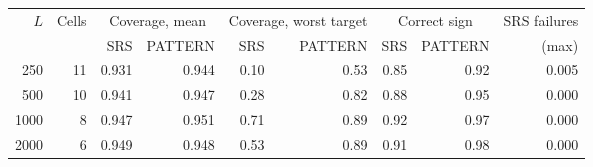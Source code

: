 \begin{tabular}{rrrrrrrrr}\toprule
$L$ & Cells & \multicolumn{2}{c}{Coverage, mean} & \multicolumn{2}{c}{Coverage, worst target} & \multicolumn{2}{c}{Correct sign} & SRS failures \\
 & & SRS & PATTERN & SRS & PATTERN & SRS & PATTERN & (max) \\\midrule
250 & 11 & 0.931 & 0.944 & 0.10 & 0.53 & 0.85 & 0.92 & 0.005 \\
500 & 10 & 0.941 & 0.947 & 0.28 & 0.82 & 0.88 & 0.95 & 0.000 \\
1000 & 8 & 0.947 & 0.951 & 0.71 & 0.89 & 0.92 & 0.97 & 0.000 \\
2000 & 6 & 0.949 & 0.948 & 0.53 & 0.89 & 0.91 & 0.98 & 0.000 \\
\bottomrule\end{tabular}
